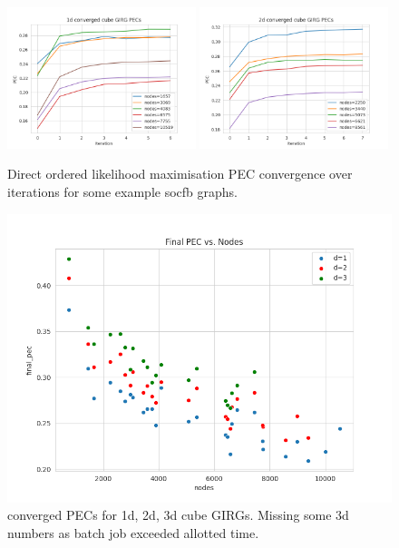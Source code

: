 \begin{figure}
  \centering
  \includegraphics[width=0.49\textwidth]{figures/mcmc_ordered_1d_pec_convergence.png}
  \includegraphics[width=0.49\textwidth]{figures/mcmc_ordered_2d_pec_convergence.png}
  \caption{Direct ordered likelihood maximisation PEC convergence over iterations for some example socfb graphs.}
  \label{fig:direct_ordered_pec_convergence_curves}
\end{figure}


\begin{figure}
  \centering
  \includegraphics[width=\textwidth]{figures/mcmc_ordered_final_pec.png}
  \caption{converged PECs for 1d, 2d, 3d cube GIRGs. Missing some 3d numbers
  as batch job exceeded allotted time.}
  \label{fig:converged_pecs}
\end{figure}



